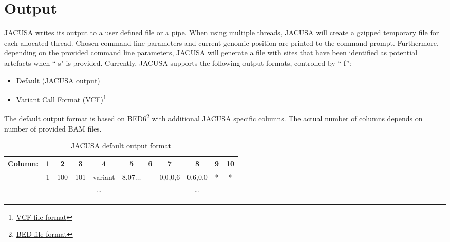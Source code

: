 \documentclass[10pt, a4paper]{article}
\begin{document}
\section{Output}
JACUSA writes its output to a user defined file or a pipe. When using multiple threads, JACUSA will
create a gzipped temporary file for each allocated thread. Chosen command line parameters
and current genomic position are printed to the command prompt. Furthermore, depending on
the provided command line parameters, JACUSA will generate a file with sites that have been
identified as potential artefacts when ``-s" is provided. Currently, JACUSA supports the following
output formats, controlled by ``-f'':
\begin{itemize}
  \item Default (JACUSA output)
  \item Variant Call Format
  (VCF)\footnote{\href{http://samtools.github.io/hts-specs/VCFv4.1.pdf]}{VCF file format}}
\end{itemize}
The default output format is based on
BED6\footnote{\href{http://genome.ucsc.edu/FAQ/FAQformat.html\#format1}{BED file format}} with
additional JACUSA specific columns. The actual number of columns depends on number of provided BAM
files.
\begin{table}[ht]
\caption{JACUSA default output format}
{\small
\begin{tabular}{lcccccc|cccc}
Column: & 1 & 2 & 3 & 4 & 5 & 6 & 7 & 8 & 9 & 10 \\
\hline
& 1 & 100 & 101 & variant & $8.07\ldots$ & - & 0,0,0,6 & 0,6,0,0 & * & * \\	
& \multicolumn{6}{c|}{\ldots} & \multicolumn{4}{c}{\ldots}
\end{tabular}}
\end{table}
\end{document}
